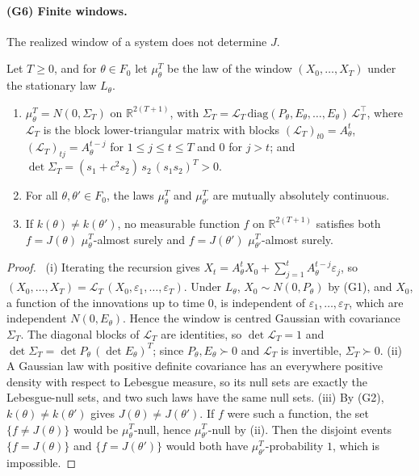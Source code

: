 \paragraph{(G6) Finite windows.} The realized window of a system does not determine $J$.
\begin{proposition}\label{prop:windows}
Let $T\ge0$, and for $\theta\in F_0$ let $\mu_\theta^T$ be the law of the window $(X_0,\dots,X_T)$ under the stationary law $L_\theta$.
\begin{enumerate}
\item[(i)] $\mu_\theta^T=N(0,\Sigma_T)$ on $\mathbb R^{2(T+1)}$, with $\Sigma_T=\mathcal L_T\,\mathrm{diag}(P_\theta,E_\theta,\dots,E_\theta)\,\mathcal L_T^\top$, where $\mathcal L_T$ is the block lower-triangular matrix with blocks $(\mathcal L_T)_{t0}=A_\theta^t$, $(\mathcal L_T)_{tj}=A_\theta^{t-j}$ for $1\le j\le t\le T$ and $0$ for $j>t$; and $\det\Sigma_T=(s_1+c^2s_2)\,s_2\,(s_1s_2)^T>0$.
\item[(ii)] For all $\theta,\theta'\in F_0$, the laws $\mu_\theta^T$ and $\mu_{\theta'}^T$ are mutually absolutely continuous.
\item[(iii)] If $k(\theta)\ne k(\theta')$, no measurable function $f$ on $\mathbb R^{2(T+1)}$ satisfies both $f=J(\theta)$ $\mu_\theta^T$-almost surely and $f=J(\theta')$ $\mu_{\theta'}^T$-almost surely.
\end{enumerate}
\end{proposition}
\begin{proof}
\stA\ (i) Iterating the recursion gives $X_t=A_\theta^tX_0+\sum_{j=1}^tA_\theta^{t-j}\varepsilon_j$, so $(X_0,\dots,X_T)=\mathcal L_T\,(X_0,\varepsilon_1,\dots,\varepsilon_T)$. Under $L_\theta$, $X_0\sim N(0,P_\theta)$ by (G1), and $X_0$, a function of the innovations up to time $0$, is independent of $\varepsilon_1,\dots,\varepsilon_T$, which are independent $N(0,E_\theta)$. Hence the window is centred Gaussian with covariance $\Sigma_T$. The diagonal blocks of $\mathcal L_T$ are identities, so $\det\mathcal L_T=1$ and $\det\Sigma_T=\det P_\theta\,(\det E_\theta)^T$; since $P_\theta,E_\theta\succ0$ and $\mathcal L_T$ is invertible, $\Sigma_T\succ0$. (ii) A Gaussian law with positive definite covariance has an everywhere positive density with respect to Lebesgue measure, so its null sets are exactly the Lebesgue-null sets, and two such laws have the same null sets. (iii) By (G2), $k(\theta)\ne k(\theta')$ gives $J(\theta)\ne J(\theta')$. If $f$ were such a function, the set $\{f\ne J(\theta)\}$ would be $\mu_\theta^T$-null, hence $\mu_{\theta'}^T$-null by (ii). Then the disjoint events $\{f=J(\theta)\}$ and $\{f=J(\theta')\}$ would both have $\mu_{\theta'}^T$-probability $1$, which is impossible.
\end{proof}
